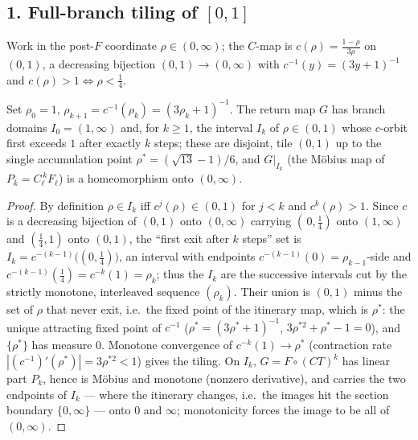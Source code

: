 \documentclass[11pt]{article}
\theoremstyle{remark}\newtheorem{remark}{Remark}
\begin{document}
\subsection*{1. Full-branch tiling of $[0,1]$}
Work in the post-$F$ coordinate $\rho\in(0,\infty)$; the $C$-map is
$c(\rho)=\tfrac{1-\rho}{3\rho}$ on $(0,1)$, a decreasing bijection
$(0,1)\to(0,\infty)$ with $c^{-1}(y)=(3y+1)^{-1}$ and $c(\rho)>1\iff\rho<\tfrac14$.
\begin{proposition}\label{p:tile}
Set $\rho_0=1$, $\rho_{k+1}=c^{-1}(\rho_k)=(3\rho_k+1)^{-1}$. The return map
$G$ has branch domains $I_0=(1,\infty)$ and, for $k\ge1$, the interval
$I_k$ of $\rho\in(0,1)$ whose $c$-orbit first exceeds $1$ after exactly $k$
steps; these are disjoint, tile $(0,1)$ up to the single accumulation point
$\rho^\ast=(\sqrt{13}-1)/6$, and $G|_{I_k}$ (the M\"obius map of
$P_k=C_\ell^{\,k}F_\ell$) is a homeomorphism onto $(0,\infty)$.
\end{proposition}
\begin{proof}
By definition $\rho\in I_k$ iff $c^{j}(\rho)\in(0,1)$ for $j<k$ and
$c^{k}(\rho)>1$. Since $c$ is a decreasing bijection of $(0,1)$ onto
$(0,\infty)$ carrying $(\,0,\tfrac14)$ onto $(1,\infty)$ and $(\tfrac14,1)$
onto $(0,1)$, the ``first exit after $k$ steps'' set is
$I_k=c^{-(k-1)}\big((0,\tfrac14)\big)$, an interval with endpoints
$c^{-(k-1)}(0)=\rho_{k-1}$-side and $c^{-(k-1)}(\tfrac14)=c^{-k}(1)=\rho_k$;
thus the $I_k$ are the successive intervals cut by the strictly monotone,
interleaved sequence $(\rho_k)$. Their union is $(0,1)$ minus the set of
$\rho$ that never exit, i.e.\ the fixed point of the itinerary map, which is
$\rho^\ast$: the unique attracting fixed point of $c^{-1}$
($\rho^\ast=(3\rho^\ast+1)^{-1}$, $3\rho^{\ast2}+\rho^\ast-1=0$), and
$\{\rho^\ast\}$ has measure $0$. Monotone convergence of $c^{-k}(1)\to
\rho^\ast$ (contraction rate $|(c^{-1})'(\rho^\ast)|=3\rho^{\ast2}<1$) gives
the tiling. On $I_k$, $G=F\circ(CT)^k$ has linear part $P_k$, hence is
M\"obius and monotone (nonzero derivative), and carries the two endpoints of
$I_k$ --- where the itinerary changes, i.e.\ the images hit the section
boundary $\{0,\infty\}$ --- onto $0$ and $\infty$; monotonicity forces the
image to be all of $(0,\infty)$.
\end{proof}
\end{document}
